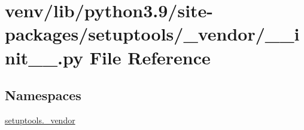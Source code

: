 \hypertarget{venv_2lib_2python3_89_2site-packages_2setuptools_2__vendor_2____init_____8py}{}\section{venv/lib/python3.9/site-\/packages/setuptools/\+\_\+vendor/\+\_\+\+\_\+init\+\_\+\+\_\+.py File Reference}
\label{venv_2lib_2python3_89_2site-packages_2setuptools_2__vendor_2____init_____8py}
\subsection*{Namespaces}
\begin{DoxyCompactItemize}
\item 
 \hyperlink{namespacesetuptools_1_1__vendor}{setuptools.\+\_\+vendor}
\end{DoxyCompactItemize}
